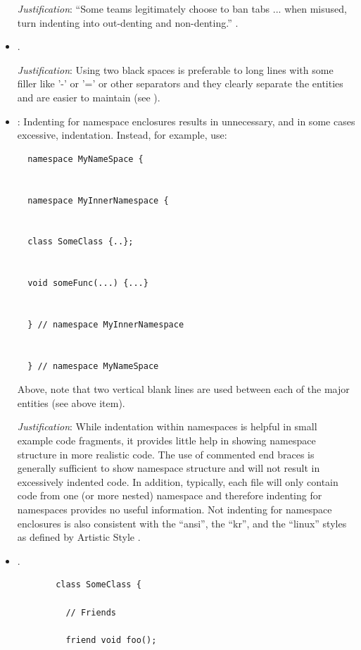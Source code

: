 \begin{itemize}
{}\textit{Justification}: ``Some teams legitimately choose to ban tabs
... when misused, turn indenting into out-denting and non-denting.''
{}\cite[Item 0]{C++CodingStandards05}.

{}\item\FSCTwoVertialSpaces.

{}\textit{Justification}: Using two black spaces is preferable to long lines
with some filler like '-' or '=' or other separators and they clearly separate
the entities and are easier to maintain (see {}\cite[Section
31.8]{CodeComplete2nd04}).

{}\item\FSCNoNamespaceIndent: Indenting for namespace enclosures results in
unnecessary, and in some cases excessive, indentation.  Instead, for example,
use:

{\small\begin{verbatim}
  namespace MyNameSpace {


  namespace MyInnerNamespace {


  class SomeClass {..};


  void someFunc(...) {...}


  } // namespace MyInnerNamespace


  } // namespace MyNameSpace
\end{verbatim}}

Above, note that two vertical blank lines are used between each of the major
entities (see above item).

{}\textit{Justification}: While indentation within namespaces is helpful in
small example code fragments, it provides little help in showing namespace
structure in more realistic code.  The use of commented end braces is
generally sufficient to show namespace structure and will not result in
excessively indented code.  In addition, typically, each file will only
contain code from one (or more nested) namespace and therefore indenting for
namespaces provides no useful information.  Not indenting for namespace
enclosures is also consistent with the ``ansi'', the ``kr'', and the ``linux''
styles as defined by Artistic Style {}\cite{ArtisticStyle}.

{}\item\FSCClassDeclarationLayout.

\begin{figure}
%
{\small\begin{verbatim}
  class SomeClass {

    // Friends

    friend void foo();


\end{verbatim}}
\end{figure}
\end{itemize}
